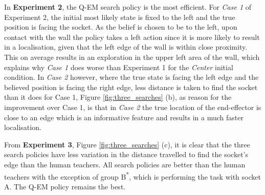In \textbf{Experiment 2}, the Q-EM search policy is the most efficient. For \textit{Case 1} of Experiment 2, the initial most 
likely state is fixed to the left and the true position is facing the socket. As the belief is chosen to be 
to the left, upon contact with the wall the policy takes a left action since it is more likely to result in a localisation, given 
that the left edge of the wall is within close proximity. 
This on average results in an exploration in the upper left area of the wall, which explains why \textit{Case 1} does worse than Experiment 1
for the \textit{Center} initial condition. In \textit{Case 2} however, where the true state is facing the left 
edge and the believed position is facing the right edge, less distance is taken to find the socket than it does for Case 1, 
Figure \ref{fig:three_searches} (b), as reason for the improvement over Case 1, is that in \textit{Case 2} the true location of 
the end-effector is close to an edge which is an informative feature and results in a much faster localisation.

From \textbf{Experiment 3}, Figure \ref{fig:three_searches} (c), it is clear that the three search policies have 
less variation in the distance travelled to find the socket's edge than the human teachers. 
All search policies are better than the human teachers with the exception of group B\textsuperscript{*}, 
which is performing the task with socket A. The Q-EM policy remains the best. 

